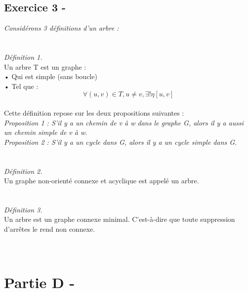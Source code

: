 \documentclass{article}
\begin{document}
\subsection*{Exercice 3 -}
\textit{Considérons 3 définitions d'un arbre : }\\\\\\

\textit{Définition 1.}\\
\textsf{Un arbre T est un graphe :}\\
\textsf{• Qui est simple (sans boucle)}\\
\textsf{• Tel que : }\\
\begin{equation}
\forall (u,v) \in T, u \neq v, \exists! \eta[u,v]
\end{equation}\\
\textsf{Cette définition repose sur les deux propositions suivantes :}\\
\textit{Proposition 1 : S'il y a un chemin de v à w dans le graphe G, alors il y a aussi un chemin simple de v à w.}\\
\textit{Proposition 2 : S'il y a un cycle dans G, alors il y a un cycle simple dans G.}\\\\\\

\textit{Définition 2.}\\
\textsf{Un graphe non-orienté connexe et acyclique est appelé un arbre.}\\\\\\

\textit{Définition 3.}\\
\textsf{Un arbre est un graphe connexe minimal. C'est-à-dire que toute suppression d'arrêtes le rend non connexe.}\\\\\\

\section*{Partie D -}
\end{document}
